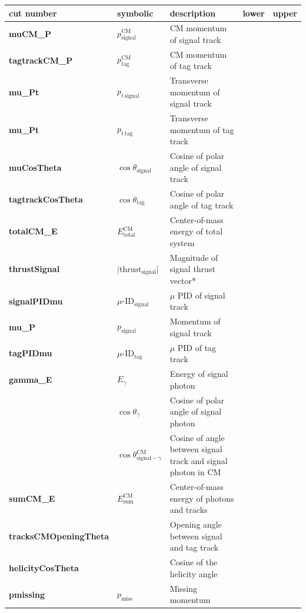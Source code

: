 \documentclass[12pt,a4paper]{article} %
\begin{document}
\begin{table}[h]
\centering
\begin{tabular}{lllll}
\textbf{cut number} & \textbf{symbolic} & \textbf{description} & \textbf{lower} & \textbf{upper} \\ \hline
\textbf{muCM\_P} & $p_{\text{signal}}^{\text{CM}}$  & CM momentum of signal track  &  &  \\
\textbf{tagtrackCM\_P} & $p_{\text{tag}}^{\text{CM}}$  & CM momentum of tag track &  &  \\
\textbf{mu\_Pt} & $p_{t~\text{signal}}$ & Transverse momentum of signal track &  &  \\
\textbf{mu\_Pt} & $p_{t~\text{tag}}$ & Transverse momentum of tag track &  &  \\
\textbf{muCosTheta} & $\cos\theta_{\text{signal}}$ & Cosine of polar angle of signal track &  &  \\
\textbf{tagtrackCosTheta} & $\cos\theta_{\text{tag}}$ & Cosine of polar angle of tag track &  &  \\
\textbf{totalCM\_E} & $E_{\text{total}}^{\text{CM}}$ & Center-of-mass energy of total system  &  &  \\
\textbf{thrustSignal} & $\lvert\text{thrust}_{\text{signal}}\rvert$ & Magnitude of signal thrust vector* &  &  \\
\textbf{signalPIDmu} & $\mu\text{-ID}_{\text{signal}}$ & $\mu$ PID of signal track &  &  \\
\textbf{mu\_P} & $p_{\text{signal}}$  & Momentum of signal track &  &  \\
\textbf{tagPIDmu} & $\mu\text{-ID}_{\text{tag}}$ & $\mu$ PID of tag track &  &  \\
\textbf{gamma\_E} & $E_{\gamma}$ & Energy of signal photon &  &  \\
 & $\cos\theta_{\gamma}$ & Cosine of polar angle of signal photon &  &  \\
 & $\cos\theta^{\text{CM}}_{\text{signal}-\gamma}$ & Cosine of angle between signal track and signal photon in CM &  &  \\
\textbf{sumCM\_E} & $E_{\text{sum}}^{\text{CM}}$ & Center-of-mass energy of photons and tracks &  &  \\
\textbf{tracksCMOpeningTheta} &  & Opening angle between signal and tag track &  &  \\
\textbf{helicityCosTheta} &  & Cosine of the helicity angle &  &  \\
\textbf{pmissing} & $p_{\text{miss}}$ & Missing momentum &  &  \\

\end{tabular}
\end{table}
\end{document}

